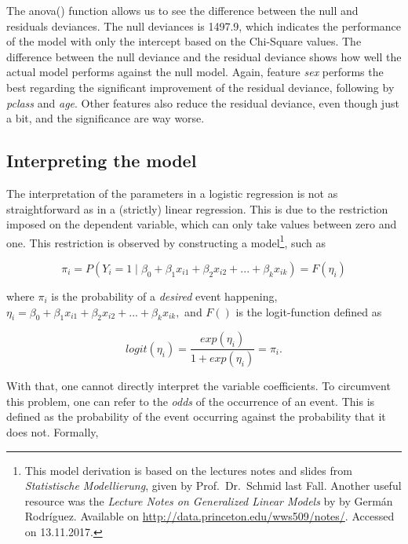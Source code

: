 \documentclass[12,]{article}
\let\rmarkdownfootnote\footnote%
\def\footnote{\protect\rmarkdownfootnote}
\begin{document}
The anova() function allows us to see the difference between the null
and residuals deviances. The null deviances is 1497.9, which indicates
the performance of the model with only the intercept based on the
Chi-Square values. The difference between the null deviance and the
residual deviance shows how well the actual model performs against the
null model. Again, feature \emph{sex} performs the best regarding the
significant improvement of the residual deviance, following by
\emph{pclass} and \emph{age}. Other features also reduce the residual
deviance, even though just a bit, and the significance are way worse.

\subsection{Interpreting the model}\label{interpreting-the-model}

The interpretation of the parameters in a logistic regression is not as
straightforward as in a (strictly) linear regression. This is due to the
restriction imposed on the dependent variable, which can only take
values between zero and one. This restriction is observed by
constructing a model\footnote{This model derivation is based on the
  lectures notes and slides from \emph{Statistische Modellierung}, given
  by Prof.~Dr.~Schmid last Fall. Another useful resource was the
  \emph{Lecture Notes on Generalized Linear Models} by by Germán
  Rodríguez. Available on \url{http://data.princeton.edu/wws509/notes/}.
  Accessed on 13.11.2017.}, such as

\begin{equation}
\pi_i = P(Y_i = 1 \mid \beta_0 + \beta_1 x_{i1} + \beta_2 x_{i2} + ... + \beta_k x_{ik}) = F(\eta_i)
\end{equation}

where \(\pi_i\) is the probability of a \emph{desired} event happening,
\(\eta_i = \beta_0 + \beta_1 x_{i1} + \beta_2 x_{i2} + ... + \beta_k x_{ik},\)
and \(F()\) is the logit-function defined as

\begin{equation}
logit(\eta_i) = \frac{exp(\eta_i)}{1 + exp(\eta_i)} = \pi_i.
\end{equation}

With that, one cannot directly interpret the variable coefficients. To
circumvent this problem, one can refer to the \emph{odds} of the
occurrence of an event. This is defined as the probability of the event
occurring against the probability that it does not. Formally,
\end{document}
